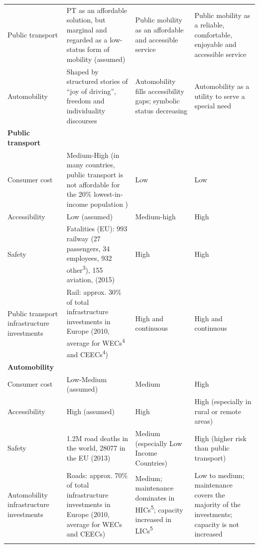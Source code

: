 \begin{longtable}{p{2.5cm}p{4.5cm}p{4cm}p{4cm}}
Public transport & PT as an affordable solution, but marginal and regarded as a low-status form of mobility (assumed) & Public mobility as an affordable and accessible service & Public mobility as a reliable, comfortable, enjoyable and accessible service \\*
Automobility & Shaped by structured stories of ``joy of driving'', freedom and individuality discourses \parencite{gartman2004_ThreeAgesAutomobile,sheller2012_EmergenceNewCultures} & Automobility fills accessibility gaps; symbolic status decreasing & Automobility as a utility to serve a special need \\\addlinespace
\textbf{Public transport} &  &  &  \\*
Consumer cost & Medium-High (in many countries, public transport is not affordable for the 20\% lowest-in-income population \parencite{carruthers2005_AffordabilityPublicTransport}) & Low & Low \\*
Accessibility & Low (assumed) & Medium-high & High \\*
Safety & Fatalities (EU): 993 railway (27 passengers, 34 employees, 932 other\textsuperscript{3}), 155 aviation, (2015) \parencite{eurostat2017_EurostatOnlineDatabase} & High & High \\*
Public transport infrastructure investments & Rail: approx. 30\% of total infrastructure investments in Europe (2010, average for WECs\textsuperscript{4} and CEECs\textsuperscript{4}) \parencite{kauppila2012_OECDCountriesSpend} & High and continuous & High and continuous \\\addlinespace
\textbf{Automobility} &  &  &  \\*
Consumer cost & Low-Medium (assumed) & Medium & High \\*
Accessibility & High (assumed) & High & High (especially in rural or remote areas) \\*
Safety & 1.2M road deaths in the world, 28077 in the EU (2013) \parencite{who2017_GlobalHealthObservatory} & Medium (especially Low Income Countries) & High (higher risk than public transport) \\*
Automobility infrastructure investments & Roads: approx. 70\% of total infrastructure investments in Europe (2010, average for WECs and CEECs) \parencite{kauppila2012_OECDCountriesSpend} & Medium; maintenance dominates in HICs\textsuperscript{5}; capacity increased in LICs\textsuperscript{5} & Low to medium; maintenance covers the majority of the investments; capacity is not increased \\\addlinespace

\end{longtable}
